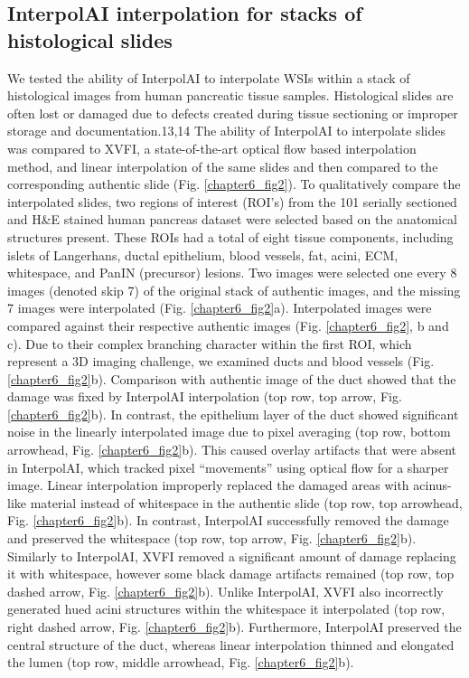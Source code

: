 \begin{refsection}
    \section{InterpolAI interpolation for stacks of histological slides}
    We tested the ability of InterpolAI to interpolate WSIs within a stack of histological images from human pancreatic tissue samples. Histological slides are often lost or damaged due to defects created during tissue sectioning or improper storage and documentation\cite{}.13,14 The ability of InterpolAI to interpolate slides was compared to XVFI, a state-of-the-art optical flow based interpolation method, and linear interpolation of the same slides and then compared to the corresponding authentic slide (Fig. \ref{chapter6_fig2})\cite{leng2013a,upchurch2017a,liu2011a,blu2004a}. To qualitatively compare the interpolated slides, two regions of interest (ROI’s) from the 101 serially sectioned and H\&E stained human pancreas dataset were selected based on the anatomical structures present. These ROIs had a total of eight tissue components, including islets of Langerhans, ductal epithelium, blood vessels, fat, acini, ECM, whitespace, and PanIN (precursor) lesions. Two images were selected one every 8 images (denoted skip 7) of the original stack of authentic images, and the missing 7 images were interpolated (Fig. \ref{chapter6_fig2}a). Interpolated images were compared against their respective authentic images (Fig. \ref{chapter6_fig2}, b and c).
    Due to their complex branching character within the first ROI, which represent a 3D imaging challenge, we examined ducts and blood vessels (Fig. \ref{chapter6_fig2}b). Comparison with authentic image of the duct showed that the damage was fixed by InterpolAI interpolation (top row, top arrow, Fig. \ref{chapter6_fig2}b). In contrast, the epithelium layer of the duct showed significant noise in the linearly interpolated image due to pixel averaging (top row, bottom arrowhead, Fig. \ref{chapter6_fig2}b). This caused overlay artifacts that were absent in InterpolAI, which tracked pixel “movements” using optical flow for a sharper image. Linear interpolation improperly replaced the damaged areas with acinus-like material instead of whitespace in the authentic slide (top row, top arrowhead, Fig. \ref{chapter6_fig2}b). In contrast, InterpolAI successfully removed the damage and preserved the whitespace (top row, top arrow, Fig. \ref{chapter6_fig2}b). Similarly to InterpolAI, XVFI removed a significant amount of damage replacing it with whitespace, however some black damage artifacts remained (top row, top dashed arrow, Fig. \ref{chapter6_fig2}b). Unlike InterpolAI, XVFI also incorrectly generated hued acini structures within the whitespace it interpolated (top row, right dashed arrow, Fig. \ref{chapter6_fig2}b). Furthermore, InterpolAI preserved the central structure of the duct, whereas linear interpolation thinned and elongated the lumen (top row, middle arrowhead, Fig. \ref{chapter6_fig2}b). 

\end{refsection}
